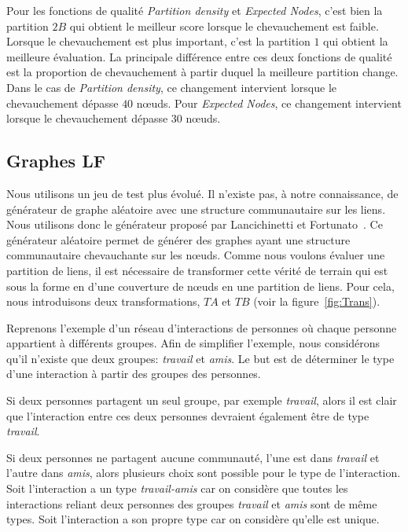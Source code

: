 Pour les fonctions de qualité \emph{Partition density} et \emph{Expected Nodes}, c'est bien la partition $2B$ qui obtient le meilleur score lorsque le chevauchement est faible.
Lorsque le chevauchement est plus important, c'est la partition $1$ qui obtient la meilleure évaluation.
La principale différence entre ces deux fonctions de qualité est la proportion de chevauchement à partir duquel la meilleure partition change.
Dans le cas de \emph{Partition density}, ce changement intervient lorsque le chevauchement dépasse $40$ n\oe{}uds.
Pour \emph{Expected Nodes}, ce changement intervient lorsque le chevauchement dépasse $30$ n\oe{}uds.

\subsection{Graphes LF}
Nous utilisons un jeu de test plus évolué.
Il n'existe pas, à notre connaissance, de générateur de graphe aléatoire avec une structure communautaire sur les liens.
Nous utilisons donc le générateur proposé par Lancichinetti et Fortunato~\cite{Lancichinetti2009b}.
Ce générateur aléatoire permet de générer des graphes ayant une structure communautaire chevauchante sur les n\oe{}uds.
Comme nous voulons évaluer une partition de liens, il est nécessaire de transformer cette vérité de terrain qui est sous la forme en d'une couverture de n\oe{}uds en une partition de liens.
Pour cela, nous introduisons deux transformations, $TA$ et $TB$ (voir la figure~\ref{fig:Trans}).


Reprenons l'exemple d'un réseau d'interactions de personnes où chaque personne appartient à différents groupes.
Afin de simplifier l'exemple, nous considérons qu'il n'existe que deux groupes: \emph{travail} et \emph{amis}.
Le but est de déterminer le type d'une interaction à partir des groupes des personnes.

Si deux personnes partagent un seul groupe, par exemple \emph{travail}, alors il est clair que l'interaction entre ces deux personnes devraient également être de type \emph{travail}.

Si deux personnes ne partagent aucune communauté, l'une est dans \emph{travail} et l'autre dans \emph{amis}, alors plusieurs choix sont possible pour le type de l'interaction.
Soit l'interaction a un type \emph{travail-amis} car on considère que toutes les interactions reliant deux personnes des groupes \emph{travail} et \emph{amis} sont de même types.
Soit l'interaction a son propre type car on considère qu'elle est unique.

